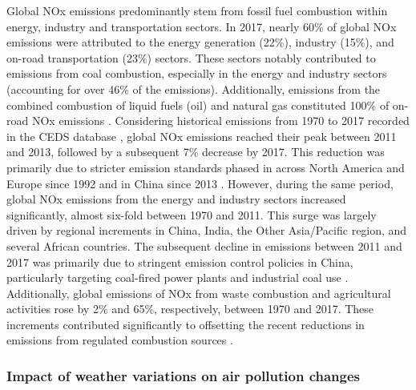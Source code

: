 Global NOx emissions predominantly stem from fossil fuel combustion within energy, industry and transportation sectors. In 2017, nearly 60\% of global NOx emissions were attributed to the energy generation (22\%), industry (15\%), and on-road transportation (23\%) sectors. These sectors notably contributed to emissions from coal combustion, especially in the energy and industry sectors (accounting for over 46\% of the emissions). Additionally, emissions from the combined combustion of liquid fuels (oil) and natural gas constituted 100\% of on-road NOx emissions \citep{mcduffie2020global}. Considering historical emissions from 1970 to 2017 recorded in the CEDS database  \citep{mcduffie2020global}, global NOx emissions reached their peak between 2011 and 2013, followed by a subsequent 7\% decrease by 2017. This reduction was primarily due to stricter emission standards phased in across North America and Europe since 1992 and in China since 2013 \citep{mcduffie2020global, zheng2018trends}. However, during the same period, global NOx emissions from the energy and industry sectors increased significantly, almost six-fold between 1970 and 2011. This surge was largely driven by regional increments in China, India, the Other Asia/Pacific region, and several African countries. The subsequent decline in emissions between 2011 and 2017 was primarily due to stringent emission control policies in China, particularly targeting coal-fired power plants and industrial coal use \citep{zheng2018trends, liu2015reduced}. Additionally, global emissions of NOx from waste combustion and agricultural activities rose by 2\% and 65\%, respectively, between 1970 and 2017. These increments contributed significantly to offsetting the recent reductions in emissions from regulated combustion sources \citep{mcduffie2020global}. \par

\subsubsection{Impact of weather variations on air pollution changes}


